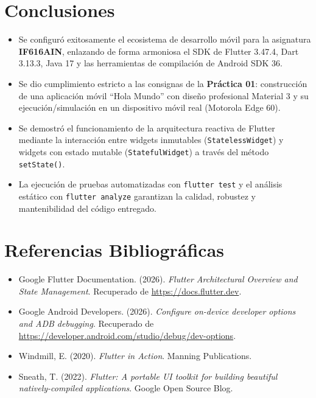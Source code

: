 \documentclass[12pt,a4paper]{article}
\begin{document}
\section{Conclusiones}
\begin{itemize}[leftmargin=*]
    \item Se configuró exitosamente el ecosistema de desarrollo móvil para la asignatura \textbf{IF616AIN}, enlazando de forma armoniosa el SDK de Flutter 3.47.4, Dart 3.13.3, Java 17 y las herramientas de compilación de Android SDK 36.
    \item Se dio cumplimiento estricto a las consignas de la \textbf{Práctica 01}: construcción de una aplicación móvil ``Hola Mundo'' con diseño profesional Material 3 y su ejecución/simulación en un dispositivo móvil real (Motorola Edge 60).
    \item Se demostró el funcionamiento de la arquitectura reactiva de Flutter mediante la interacción entre widgets inmutables (\texttt{StatelessWidget}) y widgets con estado mutable (\texttt{StatefulWidget}) a través del método \texttt{setState()}.
    \item La ejecución de pruebas automatizadas con \texttt{flutter test} y el análisis estático con \texttt{flutter analyze} garantizan la calidad, robustez y mantenibilidad del código entregado.
\end{itemize}

\section{Referencias Bibliográficas}
\begin{itemize}[leftmargin=*]
    \item Google Flutter Documentation. (2026). \textit{Flutter Architectural Overview and State Management}. Recuperado de \url{https://docs.flutter.dev}.
    \item Google Android Developers. (2026). \textit{Configure on-device developer options and ADB debugging}. Recuperado de \url{https://developer.android.com/studio/debug/dev-options}.
    \item Windmill, E. (2020). \textit{Flutter in Action}. Manning Publications.
    \item Sneath, T. (2022). \textit{Flutter: A portable UI toolkit for building beautiful natively-compiled applications}. Google Open Source Blog.
\end{itemize}
\end{document}
